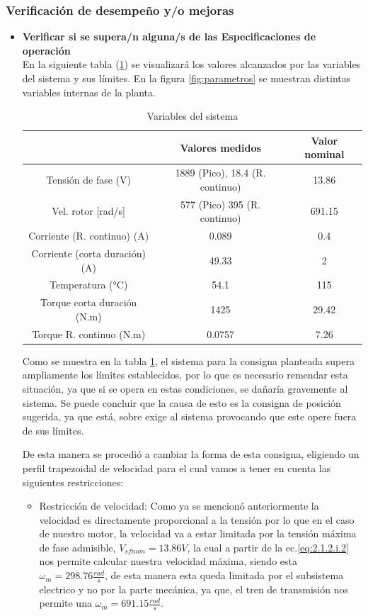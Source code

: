 \documentclass[10pt]{article}
\begin{document}
\subsubsection{Verificación de desempeño y/o mejoras}
\begin{itemize}
	\item \textbf{Verificar si se supera/n alguna/s de las Especificaciones de operación}\\
	En la siguiente tabla (\ref{tab:4}) se visualizará los valores alcanzados por las variables del sistema y sus límites. En la figura \ref{fig:parametros} se muestran distintas variables internas de la planta.
	\begin{table}[h!]
		\begin{center}
		\begin{tabular}{| c | c | c | }
		\hline
		&Valores medidos & Valor nominal  \\ \hline
		Tensión de fase (V) & 1889 (Pico), 18.4 (R. continuo) & 13.86\\ \hline
		Vel. rotor [rad/s]& 577 (Pico) 395 (R. continuo)&  691.15\\ \hline
		Corriente (R. continuo) (A) &0.089 & 0.4\\ \hline
		Corriente (corta duración) (A) &49.33 &2\\ \hline
		Temperatura (°C) &54.1 & 115\\ \hline
		Torque corta duración (N.m) & 1425 & 29.42\\ \hline
		Torque R. continuo (N.m) & 0.0757 & 7.26\\ \hline
		\end{tabular}
		\caption{Variables del sistema}
		\label{tab:4}
		\end{center}
		\end{table}



Como se muestra en la tabla \ref{tab:4}, el sistema para la consigna planteada supera ampliamente los límites establecidos, por lo que es necesario remendar esta situación, ya que si se opera en estas condiciones, se dañaría gravemente al sistema.
Se puede concluir que la causa de esto es la consigna de posición sugerida, ya que está, sobre exige al sistema provocando que este opere fuera de sus límites.

De esta manera se procedió a cambiar la forma de esta consigna, eligiendo un perfil trapezoidal de velocidad para el cual vamos a tener en cuenta las siguientes restricciones:

\begin{itemize}
	 \item Restricción de velocidad: Como ya se mencionó anteriormente la velocidad es directamente proporcional a la tensión por lo que en el caso de nuestro motor, la velocidad
	 va a estar limitada por la tensión máxima de fase admisible, \textbf{$V_{sfnom}=13.86 V$}, la cual a partir de la ec.\ref{eq:2.1.2.i.2} nos permite calcular nuestra velocidad
	 máxima, siendo esta $\omega_{m}=298.76\frac{rad}{s}$, de esta manera esta queda limitada por el subsistema electrico y no por la parte mecánica, ya que, el tren de transmisión nos 
	 permite una $\omega_{m}=691.15\frac{rad}{s}$.


\end{itemize}
\end{itemize}
\end{document}
